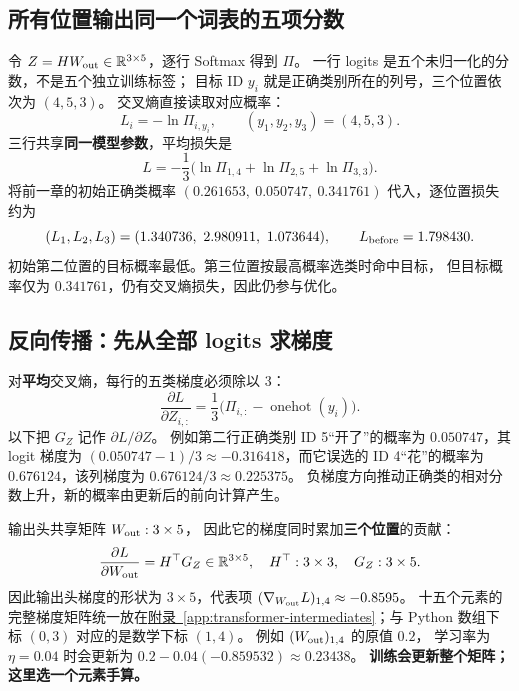 \subsection{所有位置输出同一个词表的五项分数}

令 $Z=HW_{\rm out}\in\R^{3\times5}$，逐行 Softmax 得到 $\Pi$。
一行 logits 是五个未归一化的分数，不是五个独立训练标签；
目标 ID $y_i$ 就是正确类别所在的列号，三个位置依次为 $(4,5,3)$。
交叉熵直接读取对应概率：
\[
L_i=-\ln\Pi_{i,y_i},\qquad(y_1,y_2,y_3)=(4,5,3).
\]
三行共享\textbf{同一模型参数}，平均损失是
\begin{equation}
\boxed{L=-\frac13
\bigl(\ln\Pi_{1,4}+
      \ln\Pi_{2,5}+
      \ln\Pi_{3,3}\bigr).}
\label{eq:three-position-joint-loss}
\end{equation}
将前一章的初始正确类概率 $(0.261653,\ 0.050747,\ 0.341761)$
代入，逐位置损失约为
\[
(L_1,L_2,L_3)=(1.340736,\ 2.980911,\ 1.073644),
\qquad
\boxed{L_{\rm before}=1.798430}.
\]
初始第二位置的目标概率最低。第三位置按最高概率选类时命中目标，
但目标概率仅为 $0.341761$，仍有交叉熵损失，因此仍参与优化。

\subsection{反向传播：先从全部 logits 求梯度}
\label{sec:transformer-gradient-step}

对\textbf{平均}交叉熵，每行的五类梯度必须除以 $3$：
\begin{equation}
\boxed{\frac{\partial L}{\partial Z_{i,:}}
=\frac13\bigl(\Pi_{i,:}
-\operatorname{onehot}(y_i)\bigr).}
\label{eq:three-position-logit-grad}
\end{equation}
以下把 $G_Z$ 记作 $\partial L/\partial Z$。
例如第二行正确类别 ID 5“开了”的概率为 $0.050747$，其 logit 梯度为
$(0.050747-1)/3\approx-0.316418$，而它误选的
ID 4“花”的概率为 $0.676124$，该列梯度为 $0.676124/3\approx0.225375$。
负梯度方向推动正确类的相对分数上升，新的概率由更新后的前向计算产生。

输出头共享矩阵 $W_{\rm out}:3\times5$，
因此它的梯度同时累加\textbf{三个位置}的贡献：
\[
\frac{\partial L}{\partial W_{\rm out}}=H^\top G_Z
\in\mathbb R^{3\times5},\quad
H^\top:3\times3,\quad G_Z:3\times5.
\]
因此输出头梯度的形状为 $3\times5$，代表项
$(\nabla_{W_{\rm out}}L)_{1,4}\approx-0.8595$。
十五个元素的完整梯度矩阵统一放在\hyperref[app:transformer-intermediates]{附录~\ref*{app:transformer-intermediates}}；与 Python 数组下标 $(0,3)$ 对应的是数学下标 $(1,4)$。
例如 $(W_{\rm out})_{1,4}$ 的原值 $0.2$，
学习率为 $\eta=0.04$ 时会更新为
$0.2-0.04(-0.859532)\approx0.23438$。
\textbf{训练会更新整个矩阵；这里选一个元素手算。}\label{route:joint-core-end}

